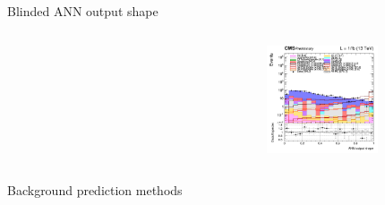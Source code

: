 \documentclass[8pt]{beamer}
\begin{document}
\begin{frame}{Blinded ANN output shape}
\begin{columns}
\begin{column}{0.33\textwidth}
\begin{center}
    		\end{center}		
		\end{column}
		\begin{column}{0.33\textwidth}
			\begin{center}
     			\includegraphics[width=1.0\textwidth, height=90pt]{figs/2018/log_cratio_topCR_ll_var_DNN_signal0_scalar500.png}
    		\end{center}		
		\end{column}
\end{columns} \vfill
\end{frame}











































\begin{frame}[standout]
Background prediction methods
\end{frame}
\end{document}
